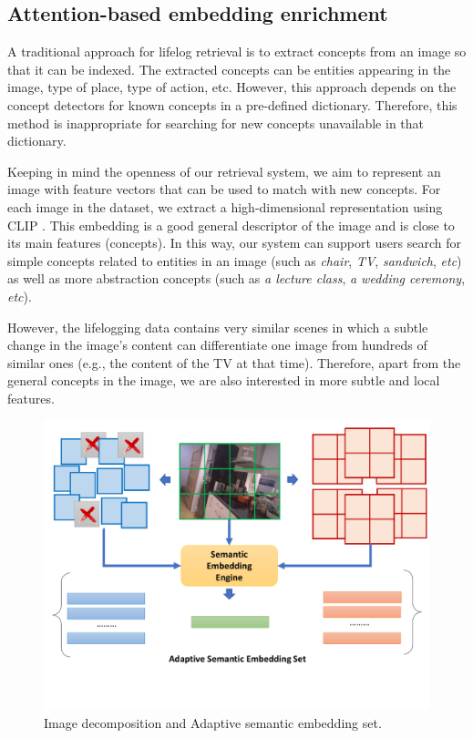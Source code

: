 \subsection{Attention-based embedding enrichment}
\label{sec:attention_based_embedding_enrichment}

A traditional approach for lifelog retrieval is to extract concepts from an image so that it can be indexed. The extracted concepts can be entities appearing in the image, type of place, type of action, etc. However, this approach depends on the concept detectors for known concepts in a pre-defined dictionary. Therefore, this method is inappropriate for searching for new concepts unavailable in that dictionary.


Keeping in mind the openness of our retrieval system, we aim to represent an image with feature vectors that can be used to match with new concepts. 
For each image in the dataset, we extract a high-dimensional representation using CLIP \cite{radford_learning_2021}. This embedding is a good general descriptor of the image and is close to its main features (concepts). In this way, our system can support users search for simple concepts related to entities in an image (such as \textit{chair}, \textit{TV}, \textit{sandwich}, \textit{etc}) as well as more abstraction concepts (such as \textit{a lecture class}, \textit{a wedding ceremony}, \textit{etc}).

However, the lifelogging data contains very similar scenes in which a subtle change in the image's content can differentiate one image from hundreds of similar ones (e.g., the content of the TV at that time). Therefore, apart from the general concepts in the image, we are also interested in more subtle and local features. 

\begin{figure}[t]
    \centering
    \includegraphics[width=1\columnwidth]{content/resources/images/methods/AdaptiveSemanticEmbeddingSet.pdf}
    \caption{Image decomposition and Adaptive semantic embedding set.}
    \label{fig:AdaptiveSemanticEmbeddingSet}
\end{figure}


